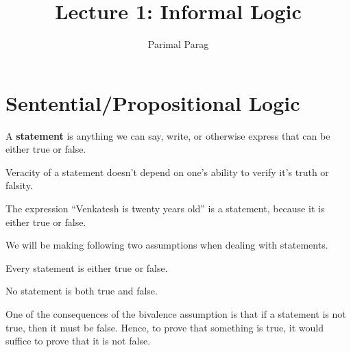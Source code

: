 \documentclass[]{article}
\title{Lecture 1: Informal Logic}
\author{Parimal Parag}
\begin{document}
\maketitle

\section{Sentential/Propositional Logic}
\begin{defn}[Statement] A \textbf{statement} is anything we can say, write, or otherwise express that can be either true or false. 
\end{defn}
\begin{rem} Veracity of a statement doesn't depend on one's ability to verify it's truth or falsity.
\end{rem}
\begin{exmp}
The expression ``Venkatesh is twenty years old'' is a statement, because it is either true or false.
\end{exmp}
We will be making following two assumptions when dealing with statements.
\begin{assum}[Bivalence] Every statement is either true or false.
\end{assum}
\begin{assum} No statement is both true and false.
\end{assum}
One of the consequences of the bivalence assumption is that if a statement is not true, then it must be false. Hence, to prove that something is true, it would suffice to prove that it is not false.
\end{document}
